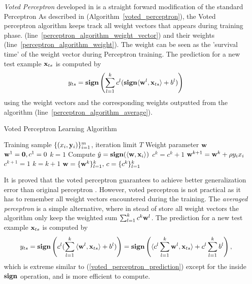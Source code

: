 {\textit{Voted Perceptron} developed in \citep{Freund99large} is a straight forward modification of the standard Perceptron
As described in (Algorithm~\ref{voted_perceptron}), the Voted perceptron algorithm keeps track all weight vectors that appears during training phase. (line~\ref{perceptron_algorithm_weight_vector}) and their weights (line~\ref{perceptron_algorithm_weight}).
The weight can be seen as the 'survival time' of the weight vector during Perceptron training.
The prediction for a new test example $\mathbf {x}_{ts}$ is computed by 
\begin{align}
	y_{ts} = \textbf{sign}\left({\sum_{l=1}^{k}c^l(\textbf{sign}{\langle \mathbf {w}^l, \mathbf {x}_{ts} \rangle+b^{l}}})\right) \label{voted_perceptron_prediction}
\end{align}
using the weight vectors and the corresponding weights outputted from the algorithm (line~\ref{perceptron_algorithm_average}).
\begin{algorithm}
\caption{Voted Perceptron Learning Algorithm}
\label{voted_perceptron}
\begin{algorithmic}[1]
	\REQUIRE Training sample $\lbrace (x_i,\mathbf {y}_i)\rbrace_{i=1}^m$, iteration limit $T$
	\ENSURE Weight parameter $\mathbf {w}$
	\STATE $\mathbf {w}^{1}=\mathbf {0},c^1=0$
	\STATE $k=1$
			\STATE Compute $\hat{y} = \textbf{sign}(\langle \mathbf {w}, \mathbf {x}_i \rangle)$
				\STATE $c^k = c^k + 1$
			\ELSE
				\STATE $\mathbf {w}^{k+1} = \mathbf {w}^{k} + \rho y_ix_i$ \label{perceptron_algorithm_weight_vector}
				\STATE $c^{k+1} =1$ \label{perceptron_algorithm_weight}
				\STATE $k=k+1$
			\ENDIF
		\ENDFOR
	\ENDFOR
	\RETURN $\mathbf {w} = \{\mathbf {w}^{k}\}_{l=1}^{k},\,c = \{c^{k}\}_{l=1}^{k}$ \label{perceptron_algorithm_average}
\end{algorithmic}
\end{algorithm}

It is proved that the voted perceptron guarantees to achieve better generalization error than original perceptron \citep{}.
However, voted perceptron is not practical as it has to remember all weight vectors encountered during the training.
The \textit{averaged perceptron} is a simple alternative, where in stead of store all weight vectors the algorithm only keep the weighted sum $\sum_{l=1}^{k}c^k\mathbf {w}^l$. 
The prediction for a new test example $\mathbf {x}_{ts}$ is computed by 
\begin{align*}
	y_{ts} = \textbf{sign}\left(c^l({\sum_{l=1}^{k}{\langle \mathbf {w}^l, \mathbf {x}_{ts} \rangle+b^{l}}})\right) = \textbf{sign}\left({{\langle c^l\sum_{l=1}^{k}\mathbf {w}^l, \mathbf {x}_{ts} \rangle+c^l\sum_{l=1}^{k}b^{l}}}\right),
\end{align*}
which is extreme similar to (\ref{voted_perceptron_prediction}) except for the inside $\textbf{sign}$ operation, and is more efficient to compute.

}
